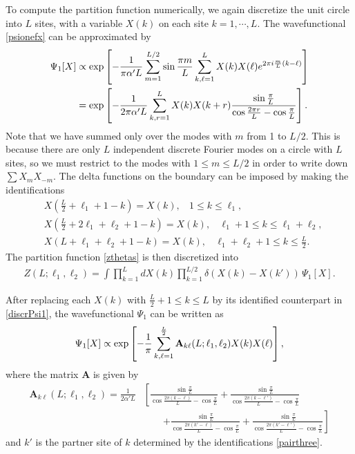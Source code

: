 \documentclass[12pt]{article}
\def\ie{\begin{equation}\begin{aligned}}
\def\fe{\end{aligned}\end{equation}}
\numberwithin{equation}{section}
\begin{document}
To compute the partition function numerically, we again discretize the unit circle into $L$ sites, with a variable $X(k)$ on each site $k=1,\cdots,L$. The wavefunctional \eqref{psionefx} can be approximated by
\ie \label{discrPsi1}
\Psi_1[X] &\propto \exp\left[ - {1\over \pi \alpha' L} \sum_{m=1}^{L/2} \sin {\pi m \over L} \sum_{k,\ell=1}^L X(k) X(\ell) e^{2\pi i {m\over L} (k-\ell)} \right]
\\
&= \exp\left[ - {1\over 2 \pi \alpha' L} \sum_{k,r=1}^L X(k) X(k+r) { \sin {\pi\over L} \over \cos{2\pi r\over L} - \cos{\pi\over L}} \right] .
\fe
Note that we have summed only over the modes with $m$ from 1 to $L/2$. This is because there are only $L$ independent discrete Fourier modes on a circle with $L$ sites, so we must restrict to the modes with $1\leq m\leq L/2$ in order to write down $\sum X_m X_{-m}$. The delta functions on the boundary can be imposed by making the identifications
\ie\label{pairthree}
& X(\tfrac{L}{2} + \ell_1+1 - k) = X(k),~~~~ 1\leq k \leq \ell_1,
\\
& X(\tfrac{L}{2} + 2 \ell_1 + \ell_2 +1 - k) = X(k),~~~~ \ell_1+1 \leq k \leq \ell_1 + \ell_2,
\\
& X(L+\ell_1 + \ell_2+1 - k) = X(k),~~~~ \ell_1+\ell_2+1 \leq k \leq \tfrac{L}{2}.
\fe
The partition function \eqref{zthetas} is then discretized into
\ie
Z(L;\ell_1, \ell_2) = \int \prod_{k=1}^{L} dX(k)\prod_{k=1}^{L/2} \delta(X(k)-X(k'))\,\Psi_1[X].
\fe

After replacing each $X(k)$ with $\tfrac{L}{2}+1\leq k\leq L$ by its identified counterpart in \eqref{discrPsi1}, the wavefunctional $\Psi_1$ can be written as
\ie
\Psi_1[X]\propto \exp\left[ - \frac{1}{\pi}\sum_{k,\ell=1}^{L\over 2} \mathbf{A}_{k\ell}(L;\ell_1, \ell_2) X(k) X(\ell) \right],
\fe
where the matrix $\mathbf{A}$ is given by
\ie
\label{Amatrix}
\mathbf{A}_{k\ell}(L;\ell_1, \ell_2) = \frac{1}{2 \alpha' L}&\left[\frac{\sin \frac{\pi}{L}}{\cos \frac{2\pi (k-\ell)}{L}-\cos \frac{\pi}{L}}+\frac{\sin \frac{\pi}{L}}{\cos \frac{2\pi (k-\ell')}{L}-\cos \frac{\pi}{L}}\right.\\
&\qquad\left.+\frac{\sin \frac{\pi}{L}}{\cos \frac{2\pi (k'-\ell)}{L}-\cos \frac{\pi}{L}}+\frac{\sin \frac{\pi}{L}}{\cos \frac{2\pi (k'-\ell')}{L}-\cos \frac{\pi}{L}}\right]
\fe
and $k'$ is the partner site of $k$ determined by the identifications \eqref{pairthree}.
\end{document}
